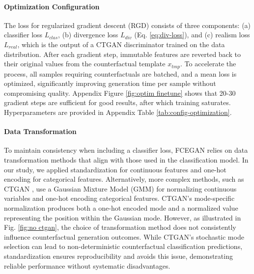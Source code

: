 \documentclass[runningheads]{llncs}
\begin{document}
\paragraph{Optimization Configuration}
The loss for regularized gradient descent (RGD) consists of three components: (a) classifier loss $L_{clas}$, (b) divergence loss $L_{div}$ (Eq. \ref{eq:div-loss}), and (c) realism loss $L_{real}$, which is the output of a CTGAN discriminator trained on the data distribution. After each gradient step, immutable features are reverted back to their original values from the counterfactual template $x_{tmp}$. To accelerate the process, all samples requiring counterfactuals are batched, and a mean loss is optimized, significantly improving generation time per sample without compromising quality. Appendix Figure \ref{fig:optim finetune} shows that 20-30 gradient steps are sufficient for good results, after which training saturates. Hyperparameters are provided in Appendix Table \ref{tab:config-optimization}.

\paragraph{Data Transformation}  
To maintain consistency when including a classifier loss, FCEGAN relies on data transformation methods that align with those used in the classification model. In our study, we applied standardization for continuous features and one-hot encoding for categorical features. Alternatively, more complex methods, such as CTGAN \cite{xu_modeling_2019}, use a Gaussian Mixture Model (GMM) for normalizing continuous variables and one-hot encoding categorical features. CTGAN's mode-specific normalization produces both a one-hot encoded mode and a normalized value representing the position within the Gaussian mode. However, as illustrated in Fig. \ref{fig:no ctgan}, the choice of transformation method does not consistently influence counterfactual generation outcomes. While CTGAN's stochastic mode selection can lead to non-deterministic counterfactual classification predictions, standardization ensures reproducibility and avoids this issue, demonstrating reliable performance without systematic disadvantages.
\end{document}
